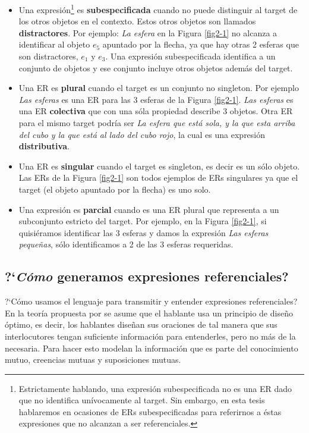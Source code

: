 \begin{itemize}
\item Una expresi\'on\footnote{Estrictamente hablando, una expresi\'on subespecificada no es una ER dado que no identifica un\'ivocamente al target. Sin embargo, en esta tesis hablaremos en ocasiones de ERs subespecificadas para referirnos a \'estas expresiones que no alcanzan a ser referenciales.} es {\bf subespecificada} cuando no puede distinguir al target de los otros objetos en el contexto. Estos otros objetos son llamados \textbf{distractores}. Por ejemplo: {\it La esfera} en la Figura \ref{fig2-1} no alcanza a identificar al objeto $e_5$ apuntado por la flecha, ya que hay otras 2 esferas que son distractores, $e_1$ y $e_3$. Una expresi\'on subespecificada identifica a un conjunto de objetos y ese conjunto incluye otros objetos adem\'as del target.

\item Una ER es {\bf plural} cuando el target es un conjunto no singleton. Por ejemplo {\it Las esferas} es una ER para las 3 esferas de la Figura \ref{fig2-1}. {\it Las esferas} es una ER \textbf{colectiva} que con una s\'ola propiedad describe 3 objetos. Otra ER para el mismo target podr\'ia ser {\it La esfera que est\'a sola, y la que esta arriba del cubo y la que est\'a al lado del cubo rojo}, la cual es una expresi\'on \textbf{distributiva}.

\item Una ER es {\bf singular} cuando el target es singleton, es decir es un s\'olo objeto. Las ERs de la Figura \ref{fig2-1} son todos ejemplos de ERs singulares ya que el target (el objeto apuntado por la flecha) es uno solo. 

\item Una expresi\'on es {\bf parcial} cuando es una ER plural que representa a un subconjunto estricto del target. Por ejemplo, en la Figura \ref{fig2-1}, si quisi\'eramos identificar las 3 esferas y damos la expresi\'on {\it Las esferas peque\~nas}, s\'olo identificamos a 2 de las 3 esferas requeridas.
\end{itemize}

\subsection{?`\emph{C\'omo} generamos expresiones referenciales?}
\label{sec:psicolinguistica}

?`C\'omo usamos el lenguaje para transmitir y entender expresiones referenciales? En la teor\'ia propuesta por \cite{clark1992arenas,clark96} se asume que el hablante usa un principio de dise\~no \'optimo, es decir, los hablantes dise\~nan sus oraciones de tal manera que sus interlocutores tengan suficiente informaci\'on para entenderles, pero no m\'as de la necesaria. Para hacer esto modelan la informaci\'on que es parte del conocimiento mutuo, creencias mutuas y suposiciones mutuas. 

